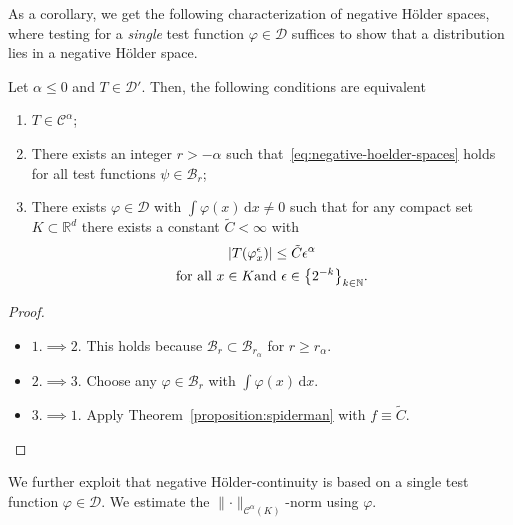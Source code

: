 As a corollary, we get the following characterization of negative Hölder spaces, where testing for a \emph{single} test function \( \varphi \in \mathcal{D} \) suffices to show that a distribution lies in a negative Hölder space.

\begin{corollary}\label{corollary:negative-hoelder-spaces}
  Let \( \alpha \leq 0 \) and \( T \in \mathcal{D}' \). Then, the following conditions are equivalent 
  \begin{enumerate}
    \item \( T \in \mathcal{C}^\alpha \);
    \item There exists an integer \( r > - \alpha \) such that~\eqref{eq:negative-hoelder-spaces} holds for all test functions \( \psi \in \mathcal{B}_r \);
    \item There exists \( \varphi \in \mathcal{D} \) with \( \int \varphi(x) \, \mathrm{d}x  \neq 0 \) such that for any compact set \( K \subset \mathbb{R}^d \) there exists a constant \( \tilde C < \infty \) with 
    \begin{gather*}
      |T(\varphi^\epsilon_x)| \leq \tilde C \epsilon^\alpha \\
      \text{for all \( x \in K \)and \( \epsilon \in \left\{ 2^{-k} \right\}_{k \in \mathbb{N}} \)}.
    \end{gather*}
  \end{enumerate}
\end{corollary}

\begin{proof}\(  \)

  \begin{itemize}
    \item \( 1. \implies 2. \) This holds because \( \mathcal{B}_r \subset \mathcal{B}_{r_\alpha} \) for \( r \geq r_\alpha \).
    \item \( 2. \implies 3. \) Choose any \( \varphi \in \mathcal{B}_{r} \) with \( \int \varphi(x) \, \mathrm{d}x \).
    \item \( 3. \implies 1. \) Apply Theorem~\ref{proposition:spiderman} with \( f \equiv \tilde C \).
  \end{itemize}
\end{proof}

We further exploit that negative Hölder-continuity is based on a single test function \( \varphi \in \mathcal{D} \). We estimate the \( \lVert \cdot \rVert_{\mathcal{C}^\alpha(K)} \)-norm using \( \varphi \).

